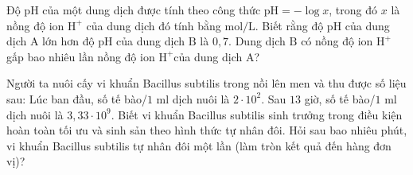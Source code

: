 \begin{baitap}
	Độ $\mathrm{pH}$ của một dung dịch được tính theo công thức $\mathrm{pH}=-\log x$, trong đó $x$ là nồng độ ion $\mathrm{H}^+$ của dung dịch đó tính bằng $\mathrm{mol}/ \mathrm{L}$. Biết rằng độ $\mathrm{pH}$ của dung dịch $\mathrm{A}$ lớn hơn độ $\mathrm{pH}$ của dung dịch $\mathrm{B}$ là $0{,}7$. Dung dịch $\mathrm{B}$ có nồng độ ion $\mathrm{H}^+$ gấp bao nhiêu lần nồng độ ion $\mathrm{H}^+$của dung dịch $\mathrm{A}$?
\end{baitap}

\begin{baitap}
	Người ta nuôi cấy vi khuẩn Bacillus subtilis trong nồi lên men và thu được số liệu sau: Lúc ban đầu, số tế bào/$1$ ml dịch nuôi là $2\cdot10^2$. Sau $13$ giờ, số tế bào/$1$ ml dịch nuôi là $3{,}33\cdot10^9$. Biết vi khuẩn Bacillus subtilis sinh trưởng trong điều kiện hoàn toàn tối ưu và sinh sản theo hình thức tự nhân đôi. Hỏi sau bao nhiêu phút, vi khuẩn Bacillus subtilis tự nhân đôi một lần (làm tròn kết quả đến hàng đơn vị)?
\end{baitap}


